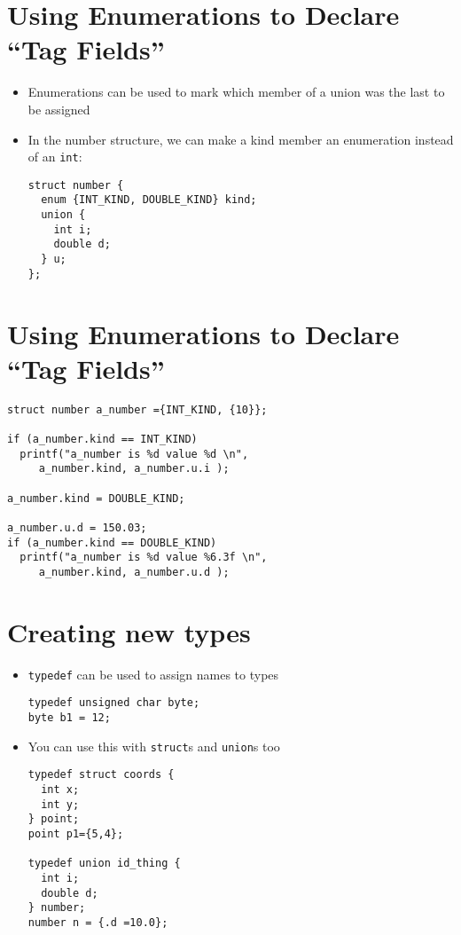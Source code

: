 \documentclass{article}
\begin{document}
\section{Using Enumerations to Declare ``Tag Fields''}
\begin{itemize}
\item Enumerations can be used to mark which member of a union was the last to be assigned

\item In the number structure, we can make a kind member an enumeration instead of an \verb!int!:
\begin{verbatim}
struct number {
  enum {INT_KIND, DOUBLE_KIND} kind;
  union {
    int i;
    double d;
  } u;
};
\end{verbatim}
\end{itemize}



\section{Using Enumerations to Declare ``Tag Fields''}
\begin{verbatim}
struct number a_number ={INT_KIND, {10}};

if (a_number.kind == INT_KIND)
  printf("a_number is %d value %d \n", 
     a_number.kind, a_number.u.i );

a_number.kind = DOUBLE_KIND;

a_number.u.d = 150.03;
if (a_number.kind == DOUBLE_KIND)
  printf("a_number is %d value %6.3f \n", 
     a_number.kind, a_number.u.d );
\end{verbatim}



\section{Creating new types}
\begin{itemize}
\item \verb!typedef! can be used to assign names to types
\begin{verbatim}
typedef unsigned char byte;
byte b1 = 12;
\end{verbatim}
\item You can use this with \verb!struct!s and \verb!union!s too
\begin{verbatim}
typedef struct coords {
  int x;
  int y;
} point;
point p1={5,4};

typedef union id_thing {
  int i;
  double d;
} number;
number n = {.d =10.0};
\end{verbatim}
\end{itemize}
\end{document}
